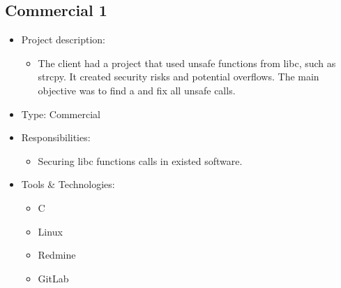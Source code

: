 \subsection{Commercial 1}
\begin{itemize}
    \item Project description:
    \begin{itemize}
        \item The client had a project that used unsafe functions from libc, such as strcpy. It
              created security risks and potential overflows. The main objective was to find
              a and fix all unsafe calls.
    \end{itemize}
    \item Type: Commercial
    \item Responsibilities:
    \begin{itemize}
        \item Securing libc functions calls in existed software.
    \end{itemize}
    \item Tools \& Technologies:
    \begin{itemize}
        \item C
        \item Linux
        \item Redmine
        \item GitLab
    \end{itemize}
\end{itemize}
